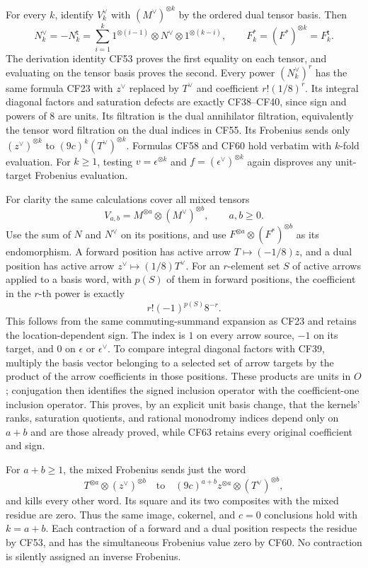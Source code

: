 \documentclass[
  10pt,
]{article}
\begin{document}
For every \(k\), identify \(V_k^\vee\) with \((M^\vee)^{\otimes k}\) by
the ordered dual tensor basis. Then \[
 N_k^\vee=-N_k^{\mathsf t}
 =\sum_{i=1}^k1^{\otimes(i-1)}\otimes N^\vee\otimes1^{\otimes(k-i)},
 \qquad F_k^*=(F^*)^{\otimes k}=F_k^{\mathsf t}.
 \tag{CF61}
\] The derivation identity CF53 proves the first equality on each
tensor, and evaluating on the tensor basis proves the second. Every
power \((N_k^\vee)^r\) has the same formula CF23 with \(z^\vee\)
replaced by \(T^\vee\) and coefficient \(r!(1/8)^r\). Its integral
diagonal factors and saturation defects are exactly CF38--CF40, since
sign and powers of \(8\) are units. Its filtration is the dual
annihilator filtration, equivalently the tensor word filtration on the
dual indices in CF55. Its Frobenius sends only \((z^\vee)^{\otimes k}\)
to \((9c)^k(T^\vee)^{\otimes k}\). Formulas CF58 and CF60 hold verbatim
with \(k\)-fold evaluation. For \(k\geq1\), testing
\(v=\epsilon^{\otimes k}\) and \(f=(\epsilon^\vee)^{\otimes k}\) again
disproves any unit-target Frobenius evaluation.

For clarity the same calculations cover all mixed tensors \[
 V_{a,b}=M^{\otimes a}\otimes(M^\vee)^{\otimes b},
 \qquad a,b\geq0.
 \tag{CF62}
\] Use the sum of \(N\) and \(N^\vee\) on its positions, and use
\(F^{\otimes a}\otimes(F^*)^{\otimes b}\) as its endomorphism. A forward
position has active arrow \(T\mapsto(-1/8)z\), and a dual position has
active arrow \(z^\vee\mapsto(1/8)T^\vee\). For an \(r\)-element set
\(S\) of active arrows applied to a basis word, with \(p(S)\) of them in
forward positions, the coefficient in the \(r\)-th power is exactly \[
 r!(-1)^{p(S)}8^{-r}.
 \tag{CF63}
\] This follows from the same commuting-summand expansion as CF23 and
retains the location-dependent sign. The index is \(1\) on every arrow
source, \(-1\) on its target, and \(0\) on \(\epsilon\) or
\(\epsilon^\vee\). To compare integral diagonal factors with CF39,
multiply the basis vector belonging to a selected set of arrow targets
by the product of the arrow coefficients in those positions. These
products are units in \(O\); conjugation then identifies the signed
inclusion operator with the coefficient-one inclusion operator. This
proves, by an explicit unit basis change, that the kernels' ranks,
saturation quotients, and rational monodromy indices depend only on
\(a+b\) and are those already proved, while CF63 retains every original
coefficient and sign.

For \(a+b\geq1\), the mixed Frobenius sends just the word \[
 T^{\otimes a}\otimes(z^\vee)^{\otimes b}
 \quad\text{to}\quad
 (9c)^{a+b}z^{\otimes a}\otimes(T^\vee)^{\otimes b},
 \tag{CF64}
\] and kills every other word. Its square and its two composites with
the mixed residue are zero. Thus the same image, cokernel, and \(c=0\)
conclusions hold with \(k=a+b\). Each contraction of a forward and a
dual position respects the residue by CF53, and has the simultaneous
Frobenius value zero by CF60. No contraction is silently assigned an
inverse Frobenius.
\end{document}
